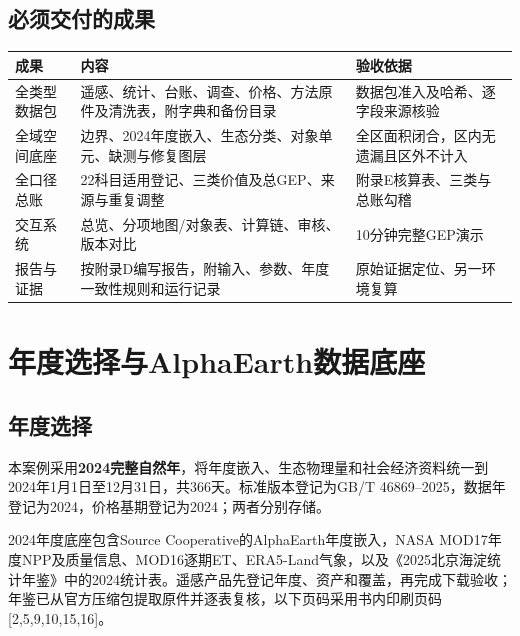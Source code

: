 \documentclass[12pt,a4paper,fontset=fandol]{ctexart}
\begin{document}
\subsection{必须交付的成果}
\begin{longtable}{P{2.3cm}P{6cm}P{4.7cm}}
\toprule 成果 & 内容 & 验收依据 \\\midrule\endhead
全类型数据包 & 遥感、统计、台账、调查、价格、方法原件及清洗表，附字典和备份目录 & 数据包准入及哈希、逐字段来源核验 \\
全域空间底座 & 边界、2024年度嵌入、生态分类、对象单元、缺测与修复图层 & 全区面积闭合，区内无遗漏且区外不计入 \\
全口径总账 & 22科目适用登记、三类价值及总GEP、来源与重复调整 & 附录E核算表、三类与总账勾稽 \\
交互系统 & 总览、分项地图/对象表、计算链、审核、版本对比 & 10分钟完整GEP演示 \\
报告与证据 & 按附录D编写报告，附输入、参数、年度一致性规则和运行记录 & 原始证据定位、另一环境复算 \\
\bottomrule
\end{longtable}

\section{年度选择与AlphaEarth数据底座}
\subsection{年度选择}
本案例采用\textbf{2024完整自然年}，将年度嵌入、生态物理量和社会经济资料统一到2024年1月1日至12月31日，共366天。标准版本登记为GB/T 46869--2025，数据年登记为2024，价格基期登记为2024；两者分别存储。

2024年度底座包含Source Cooperative的AlphaEarth年度嵌入，NASA MOD17年度NPP及质量信息、MOD16逐期ET、ERA5-Land气象，以及《2025北京海淀统计年鉴》中的2024统计表。遥感产品先登记年度、资产和覆盖，再完成下载验收；年鉴已从官方压缩包提取原件并逐表复核，以下页码采用书内印刷页码[2,5,9,10,15,16]。
\end{document}
